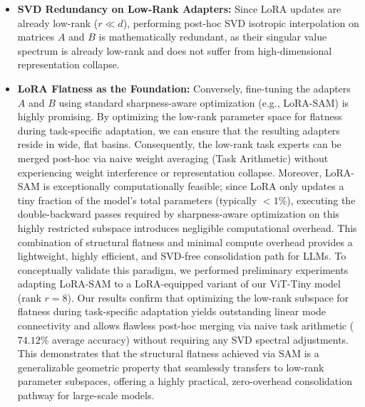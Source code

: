 \documentclass{article}
\theoremstyle{plain}
\theoremstyle{definition}
\theoremstyle{remark}
\begin{document}
\begin{itemize}
  \item \textbf{SVD Redundancy on Low-Rank Adapters:} Since LoRA updates are already low-rank ($r \ll d$), performing post-hoc SVD isotropic interpolation on matrices $A$ and $B$ is mathematically redundant, as their singular value spectrum is already low-rank and does not suffer from high-dimensional representation collapse.
  \item \textbf{LoRA Flatness as the Foundation:} Conversely, fine-tuning the adapters $A$ and $B$ using standard sharpness-aware optimization (e.g., LoRA-SAM) is highly promising. By optimizing the low-rank parameter space for flatness during task-specific adaptation, we can ensure that the resulting adapters reside in wide, flat basins. Consequently, the low-rank task experts can be merged post-hoc via naive weight averaging (Task Arithmetic) without experiencing weight interference or representation collapse. Moreover, LoRA-SAM is exceptionally computationally feasible; since LoRA only updates a tiny fraction of the model's total parameters (typically $<1\%$), executing the double-backward passes required by sharpness-aware optimization on this highly restricted subspace introduces negligible computational overhead. This combination of structural flatness and minimal compute overhead provides a lightweight, highly efficient, and SVD-free consolidation path for LLMs. To conceptually validate this paradigm, we performed preliminary experiments adapting LoRA-SAM to a LoRA-equipped variant of our ViT-Tiny model (rank $r=8$). Our results confirm that optimizing the low-rank subspace for flatness during task-specific adaptation yields outstanding linear mode connectivity and allows flawless post-hoc merging via naive task arithmetic ($74.12\%$ average accuracy) without requiring any SVD spectral adjustments. This demonstrates that the structural flatness achieved via SAM is a generalizable geometric property that seamlessly transfers to low-rank parameter subspaces, offering a highly practical, zero-overhead consolidation pathway for large-scale models.
\end{itemize}
\end{document}
